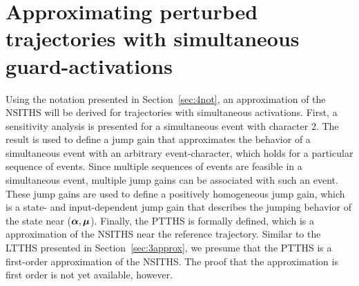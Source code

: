 \documentclass[../DC2017114Bouma.tex]{subfiles}
\begin{document}
\section{Approximating perturbed trajectories with simultaneous guard-activations}
Using the notation presented in Section~\ref{sec:4not}, an approximation of the NSITHS will be derived for trajectories with simultaneous activations. First, a sensitivity analysis is presented for a simultaneous event with character 2. The result is used to define a jump gain that approximates the behavior of a simultaneous event with an arbitrary event-character, which holds for a particular sequence of events. Since multiple sequences of events are feasible in a simultaneous event, multiple jump gains can be associated with such an event. These jump gains are used to define a positively homogeneous jump gain, which is a state- and input-dependent jump gain that describes the jumping behavior of the state near ($\boldsymbol{\alpha},\boldsymbol{\mu}$). Finally, the PTTHS is formally defined, which is a approximation of the NSITHS near the reference trajectory. Similar to the LTTHS presented in Section~\ref{sec:3approx}, we presume that the PTTHS is a first-order approximation of the NSITHS. The proof that the approximation is first order is not yet available, however.
\end{document}
